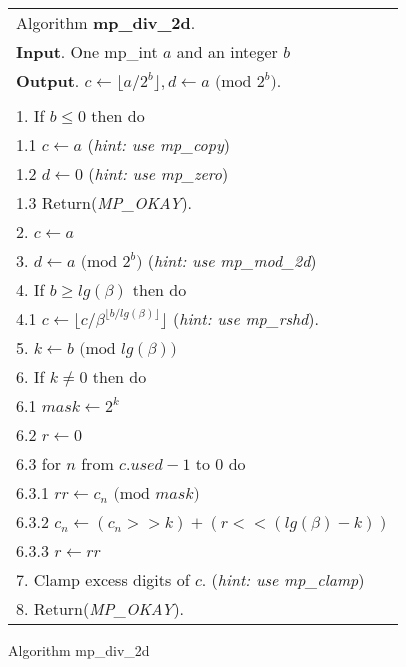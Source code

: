 \documentclass[b5paper]{book}
\begin{document}
\newpage\begin{figure}[!here]
\begin{small}
\begin{center}
\begin{tabular}{l}
\hline Algorithm \textbf{mp\_div\_2d}. \\
\textbf{Input}.   One mp\_int $a$ and an integer $b$ \\
\textbf{Output}.  $c \leftarrow \lfloor a / 2^b \rfloor, d \leftarrow a \mbox{ (mod }2^b\mbox{)}$. \\
\hline \\
1.  If $b \le 0$ then do \\
\hspace{3mm}1.1  $c \leftarrow a$ (\textit{hint: use mp\_copy}) \\
\hspace{3mm}1.2  $d \leftarrow 0$ (\textit{hint: use mp\_zero}) \\
\hspace{3mm}1.3  Return(\textit{MP\_OKAY}). \\
2.  $c \leftarrow a$ \\
3.  $d \leftarrow a \mbox{ (mod }2^b\mbox{)}$ (\textit{hint: use mp\_mod\_2d}) \\
4.  If $b \ge lg(\beta)$ then do \\
\hspace{3mm}4.1  $c \leftarrow \lfloor c/\beta^{\lfloor b/lg(\beta) \rfloor} \rfloor$ (\textit{hint: use mp\_rshd}). \\
5.  $k \leftarrow b \mbox{ (mod }lg(\beta)\mbox{)}$ \\
6.  If $k \ne 0$ then do \\
\hspace{3mm}6.1  $mask \leftarrow 2^k$ \\
\hspace{3mm}6.2  $r \leftarrow 0$ \\
\hspace{3mm}6.3  for $n$ from $c.used - 1$ to $0$ do \\
\hspace{6mm}6.3.1  $rr \leftarrow c_n \mbox{ (mod }mask\mbox{)}$ \\
\hspace{6mm}6.3.2  $c_n \leftarrow (c_n >> k) + (r << (lg(\beta) - k))$ \\
\hspace{6mm}6.3.3  $r \leftarrow rr$ \\
7.  Clamp excess digits of $c$.  (\textit{hint: use mp\_clamp}) \\
8.  Return(\textit{MP\_OKAY}). \\
\hline
\end{tabular}
\end{center}
\end{small}
\caption{Algorithm mp\_div\_2d}
\end{figure}
\end{document}
